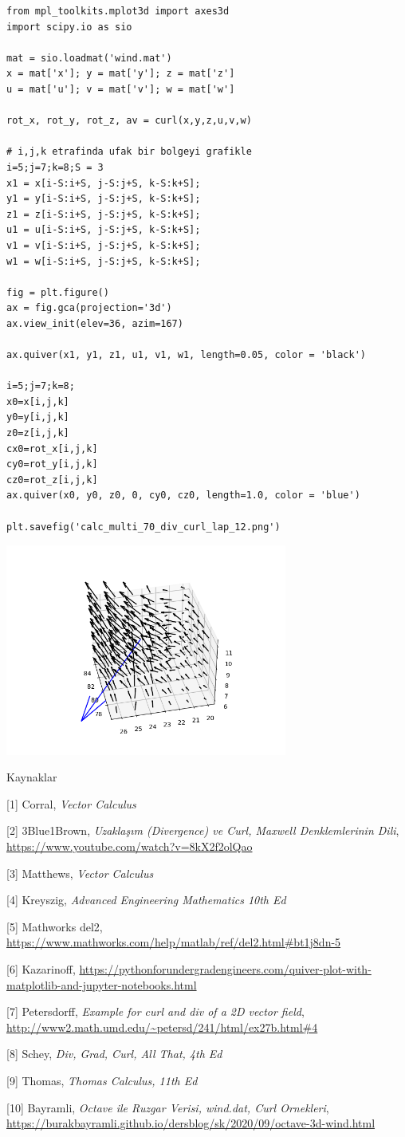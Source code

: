 \documentclass[12pt,fleqn]{article}\usepackage{../../common}
\begin{document}
\begin{verbatim}
from mpl_toolkits.mplot3d import axes3d
import scipy.io as sio

mat = sio.loadmat('wind.mat')
x = mat['x']; y = mat['y']; z = mat['z']
u = mat['u']; v = mat['v']; w = mat['w']

rot_x, rot_y, rot_z, av = curl(x,y,z,u,v,w)

# i,j,k etrafinda ufak bir bolgeyi grafikle
i=5;j=7;k=8;S = 3
x1 = x[i-S:i+S, j-S:j+S, k-S:k+S]; 
y1 = y[i-S:i+S, j-S:j+S, k-S:k+S]; 
z1 = z[i-S:i+S, j-S:j+S, k-S:k+S];
u1 = u[i-S:i+S, j-S:j+S, k-S:k+S]; 
v1 = v[i-S:i+S, j-S:j+S, k-S:k+S]; 
w1 = w[i-S:i+S, j-S:j+S, k-S:k+S];

fig = plt.figure()
ax = fig.gca(projection='3d')
ax.view_init(elev=36, azim=167)

ax.quiver(x1, y1, z1, u1, v1, w1, length=0.05, color = 'black')

i=5;j=7;k=8;
x0=x[i,j,k]
y0=y[i,j,k]
z0=z[i,j,k]
cx0=rot_x[i,j,k]
cy0=rot_y[i,j,k]
cz0=rot_z[i,j,k]
ax.quiver(x0, y0, z0, 0, cy0, cz0, length=1.0, color = 'blue')

plt.savefig('calc_multi_70_div_curl_lap_12.png')
\end{verbatim}

\includegraphics[width=25em]{calc_multi_70_div_curl_lap_12.png}


Kaynaklar 

[1] Corral, {\em Vector Calculus}

[2] 3Blue1Brown, {\em Uzaklaşım (Divergence) ve Curl, Maxwell Denklemlerinin Dili},
    \url{https://www.youtube.com/watch?v=8kX2f2olQao}

[3] Matthews, {\em Vector Calculus}

[4] Kreyszig, {\em Advanced Engineering Mathematics 10th Ed}

[5] Mathworks del2, \url{https://www.mathworks.com/help/matlab/ref/del2.html#bt1j8dn-5}

[6] Kazarinoff, \url{https://pythonforundergradengineers.com/quiver-plot-with-matplotlib-and-jupyter-notebooks.html}

[7] Petersdorff, {\em Example for curl and div of a 2D vector field}, \url{http://www2.math.umd.edu/~petersd/241/html/ex27b.html#4}

[8] Schey, {\em Div, Grad, Curl, All That, 4th Ed}

[9] Thomas, {\em Thomas Calculus, 11th Ed}

[10] Bayramli, {\em Octave ile Ruzgar Verisi, wind.dat, Curl Ornekleri},
     \url{https://burakbayramli.github.io/dersblog/sk/2020/09/octave-3d-wind.html}
\end{document}
